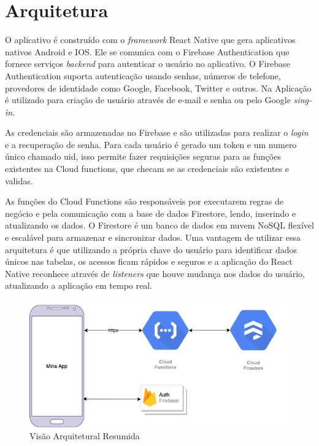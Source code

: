 \section{Arquitetura}

O aplicativo é construído com o \emph{framework} React Native que gera aplicativos nativos Android e IOS. 
Ele se comunica com o Firebase Authentication que fornece serviços \emph{backend} para autenticar 
o usuário no aplicativo. O Firebase Authentication suporta 
autenticação usando senhas, números de telefone, provedores de identidade como Google, Facebook, Twitter e 
outros. Na Aplicação é utilizado para criação de usuário através de e-mail e senha ou 
pelo Google \emph{sing-in}. 

As credenciais são armazenadas no Firebase e são utilizadas para realizar o 
\emph{login} e a recuperação de senha. Para cada usuário é gerado um token e um numero único chamado uid, isso 
permite fazer requisições seguras para as funções existentes na Cloud functions, que checam se as credenciais 
são existentes e validas.

As funções do Cloud Functions são responsáveis por executarem regras de negócio e 
pela comunicação com a base de dados Firestore, lendo, inserindo e atualizando os dados. 
O Firestore é um banco de dados em nuvem NoSQL flexível e escalável para armazenar e sincronizar dados.
Uma vantagem de utilizar essa arquitetura é que utilizando a própria chave do usuário para identificar 
dados únicos nas tabelas, os acessos ficam rápidos e seguros e a aplicação do React Native reconhece 
através de \emph{listeners} que houve mudança nos dados do usuário, atualizando a aplicação em tempo real.
 
\begin{figure}[ht]
    \centering
    \includegraphics[keepaspectratio=true,scale=0.6]{figuras/architecture.png}
    \caption{Visão Arquitetural Resumida}
        \label{fig12}
\end{figure}

